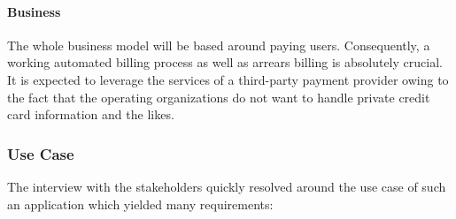 \documentclass[12pt,a4paper,twoside]{report}
\begin{document}
\paragraph{Business}
The whole business model will be based around paying users. Consequently,
a working automated billing process as well as arrears billing is absolutely
crucial. It is expected to leverage the services of a third-party payment
provider owing to the fact that the operating organizations do not want to
handle private credit card information and the likes.


\subsubsection{Use Case}

The interview with the stakeholders quickly resolved around the use case
of such an application which yielded many requirements:\\
\end{document}
